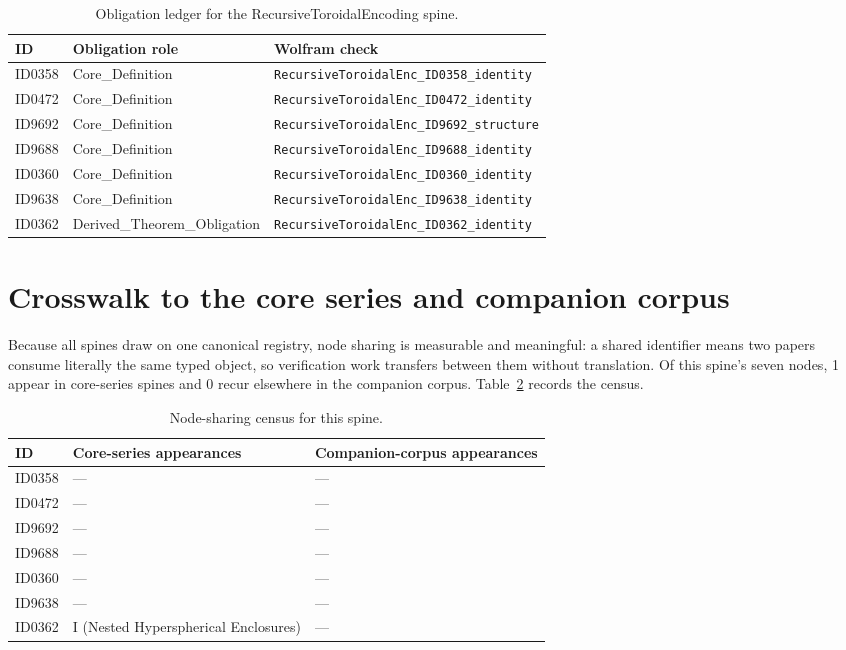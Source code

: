 \documentclass[11pt]{article}
\theoremstyle{remark}
\begin{document}
\begin{table}[ht]
\centering
\small
\caption{Obligation ledger for the RecursiveToroidalEncoding spine.}
\label{tab:obligations}
\begin{tabular}{llp{6.2cm}}
\toprule
ID & Obligation role & Wolfram check \\
\midrule
ID0358 & Core\_Definition & \texttt{RecursiveToroidalEnc\_ID0358\_identity} \\
ID0472 & Core\_Definition & \texttt{RecursiveToroidalEnc\_ID0472\_identity} \\
ID9692 & Core\_Definition & \texttt{RecursiveToroidalEnc\_ID9692\_structure} \\
ID9688 & Core\_Definition & \texttt{RecursiveToroidalEnc\_ID9688\_identity} \\
ID0360 & Core\_Definition & \texttt{RecursiveToroidalEnc\_ID0360\_identity} \\
ID9638 & Core\_Definition & \texttt{RecursiveToroidalEnc\_ID9638\_identity} \\
ID0362 & Derived\_Theorem\_Obligation & \texttt{RecursiveToroidalEnc\_ID0362\_identity} \\
\bottomrule
\end{tabular}
\end{table}

\section{Crosswalk to the core series and companion corpus}
\label{sec:crosswalk}

Because all spines draw on one canonical registry, node sharing is measurable and meaningful: a shared identifier means two papers consume literally the same typed object, so verification work transfers between them without translation. Of this spine's seven nodes, 1 appear in core-series spines and 0 recur elsewhere in the companion corpus. Table~\ref{tab:crosswalk} records the census.

\begin{table}[ht]
\centering
\small
\caption{Node-sharing census for this spine.}
\label{tab:crosswalk}
\begin{tabular}{lp{4.4cm}p{6.6cm}}
\toprule
ID & Core-series appearances & Companion-corpus appearances \\
\midrule
ID0358 & --- & --- \\
ID0472 & --- & --- \\
ID9692 & --- & --- \\
ID9688 & --- & --- \\
ID0360 & --- & --- \\
ID9638 & --- & --- \\
ID0362 & I (Nested Hyperspherical Enclosures) & --- \\
\bottomrule
\end{tabular}
\end{table}
\end{document}
